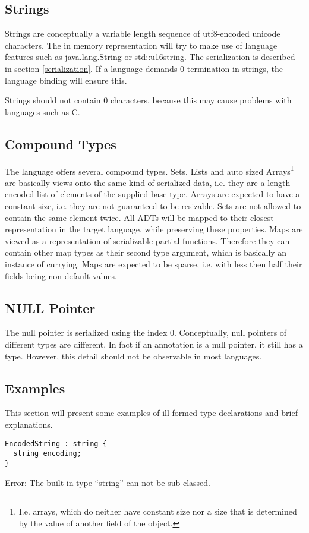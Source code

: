 \subsection{Strings}

Strings are conceptually a variable length sequence of utf8-encoded unicode characters. The in memory representation will try to make use of language features such as java.lang.String or std::u16string. The serialization is described in section \ref{serialization}. If a language demands 0-termination in strings, the language binding will ensure this.

Strings should not contain 0 characters, because this may cause problems with languages such as C.


\subsection{Compound Types}

The language offers several compound types. Sets, Lists and auto sized Arrays\footnote{I.e. arrays, which do neither have constant size nor a size that is determined by the value of another field of the object.} are basically views onto the same kind of serialized data, i.e. they are a length encoded list of elements of the supplied base type. Arrays are expected to have a constant size, i.e. they are not guaranteed to be resizable. Sets are not allowed to contain the same element twice.
All ADTs will be mapped to their closest representation in the target language, while preserving these properties.
Maps are viewed as a representation of serializable partial functions. Therefore they can contain other map types as their second type argument, which is basically an instance of currying. Maps are expected to be sparse, i.e. with less then half their fields being non default values.

\subsection{NULL Pointer}

The null pointer is serialized using the index 0. Conceptually, null pointers of different types are different. In fact if an annotation is a null pointer, it still has a type. However, this detail should not be observable in most languages.


\subsection{Examples}

This section will present some examples of ill-formed type declarations and brief explanations.

\begin{lstlisting}[label=stringExample,caption=Legal Super Types,language=skill]
EncodedString : string {
  string encoding;
}
\end{lstlisting}
Error: The built-in type ``string'' can not be sub classed.
